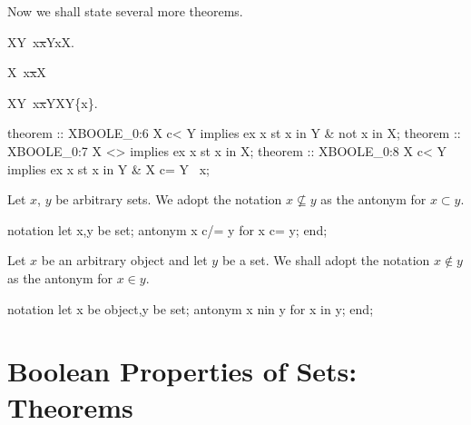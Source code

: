 \begin{paracol}{2}
\switchcolumn*\ensurevspace{5cm}
Now we shall state several more theorems.
\begin{theorem}
X\propersubset Y\implies\ \ex x\st x\in Y\land x\notin X.
\end{theorem}
\begin{theorem}
X\neq\emptyset\implies\ \ex x\st x\in X
\end{theorem}
\begin{theorem}
X\propersubset Y\implies\ \ex x\st x\in Y\land X\subset Y\setminus\{x\}.
\end{theorem}
\switchcolumn
\begin{mizar}
theorem :: XBOOLE_0:6
  X c< Y implies ex x st x in Y
                        & not x in X;
theorem :: XBOOLE_0:7
  X <> {} implies ex x st x in X;
theorem :: XBOOLE_0:8
 X c< Y implies ex x st x in Y 
                      & X c= Y \ {x};
\end{mizar}

\switchcolumn*\ensurevspace{5cm}
Let $x$, $y$ be arbitrary sets.
We adopt the notation $x\nsubseteq y$ as the antonym for $x\subset y$.
\switchcolumn
\begin{mizar}
notation
  let x,y be set;
  antonym x c/= y for x c= y;
end;
\end{mizar}

\switchcolumn*\ensurevspace{5cm}
Let $x$ be an arbitrary object and let $y$ be a set.
We shall adopt the notation $x\notin y$ as the antonym for $x\in y$.
\switchcolumn
\begin{mizar}
notation
  let x be object,y be set;
  antonym x nin y for x in y;
end;
\end{mizar}

\end{paracol}

\bigbreak
\section{Boolean Properties of Sets: Theorems}
\bigbreak


